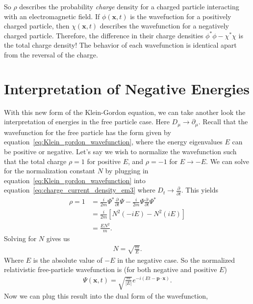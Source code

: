 \documentclass[titlepage,letterpaper,onecolumn,11pt,final]{report}
\newcommand{\psxt}{\Psi (\mathbf{x},t)}
\numberwithin{equation}{section}
\numberwithin{figure}{section}
\begin{document}
So $\rho$ describes the probability \emph{charge} density for a charged particle interacting with an electromagnetic field. If $\phi (\mathbf{x}, t)$ is the wavefuction for a positively charged particle, then $\chi (\mathbf{x}, t)$ describes the wavefunction for a negatively charged particle. Therefore, the difference in their charge densities $\phi^{*} \phi - \chi^{*} \chi$ is the total charge density! The behavior of each wavefunction is identical apart from the reversal of the charge.

\section{Interpretation of Negative Energies}

With this new form of the Klein-Gordon equation, we can take another look the interpretation of energies in the free particle case. Here $D_{\mu} \rightarrow \partial_{\mu}$. Recall that the wavefunction for the free particle has the form given by equation~\ref{eq:Klein_gordon_wavefunction}, where the energy eigenvalues $E$ can be positive or negative. Let's say we wish to normalize the wavefunction such that the total charge $\rho = 1$ for positive $E$, and $\rho = -1$ for $E \rightarrow -E$. We can solve for the normalization constant $N$ by plugging in equation~\ref{eq:Klein_gordon_wavefunction} into equation~\ref{eq:charge_current_density_em3} where $D_{t} \rightarrow \frac{\partial}{\partial t}$. This yields
\begin{equation}
\begin{split}
	\rho = 1 &= \frac{i}{2 m} \Psi^{*} \frac{\partial}{\partial t} \Psi - \frac{i}{2 m} \Psi \frac{\partial}{\partial t} \Psi^{*} \\
	&= \frac{i}{2m} \left[ N^{2} (-i E) - N^{2} (i E) \right]  \\
	&= \frac{E N^{2}}{m} .
\end{split}
\end{equation}
Solving for $N$ gives us
\begin{gather}
	N = \sqrt{\frac{m}{E}} .
\end{gather}
Where $E$ is the absolute value of $-E$ in the negative case. So the normalized relativistic free-particle wavefunction is (for both negative and positive $E$)
\begin{gather}
	\label{eq:free_particle_wfn_normalized}
	\psxt =  \sqrt{\frac{m}{|E|}} e^{-i(E t - \mathbf{p} \cdot \mathbf{x})} .
\end{gather}
%
Now we can plug this result into the dual form of the wavefunction,
\end{document}
